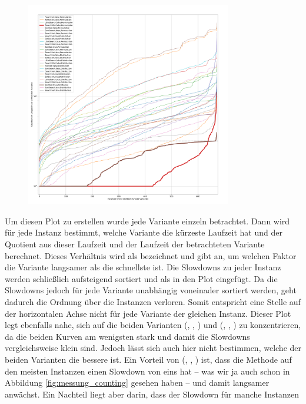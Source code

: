\begin{figure}
\centering
	\includegraphics[width = 0.8\textwidth]{figures/slowdown.pdf}
	\caption{}
	\label{fig:messung_slowdown}
\end{figure}
Um diesen Plot zu erstellen wurde jede Variante einzeln betrachtet.
Dann wird für jede Instanz bestimmt, welche Variante die kürzeste Laufzeit hat und der Quotient
aus dieser Laufzeit und der Laufzeit der betrachteten Variante berechnet. Dieses Verhältnis wird als 
bezeichnet und gibt an, um welchen Faktor die Variante langsamer als die schnellste ist. Die Slowdowns
zu jeder Instanz werden schließlich aufsteigend sortiert und als  in den Plot eingefügt.
Da die Slowdowns jedoch für jede Variante unabhängig voneinader sortiert werden, geht dadurch 
die Ordnung über die Instanzen verloren. Somit entspricht eine Stelle auf der horizontalen Achse 
nicht für jede Variante der gleichen Instanz.
Dieser Plot legt ebenfalls nahe, sich auf die beiden Varianten (\SeaUSet, \false, \perm) und 
(\SorSor, \true, \distr) zu konzentrieren, da die beiden Kurven am wenigsten stark  und damit 
die Slowdowns vergleichsweise klein sind. Jedoch lässt sich auch hier nicht bestimmen, welche der beiden
Varianten die bessere ist. Ein Vorteil von (\SeaUSet, \false, \perm) ist, 
dass die Methode auf den meisten Instanzen einen Slowdown
von eins hat -- was wir ja auch schon in Abbildung \ref{fig:messung_counting} gesehen haben --
und damit langsamer anwächst. Ein Nachteil liegt aber darin, dass der Slowdown für manche Instanzen
